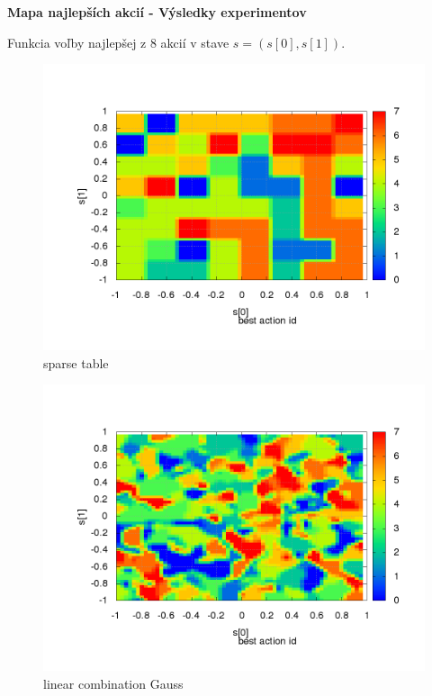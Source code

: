 \documentclass[xcolor=dvipsnames]{beamer}
\begin{document}
\begin{frame}{\bf Mapa najlepších akcií - Výsledky experimentov}

Funkcia voľby najlepšej z 8 akcií v stave  $s = (s[0], s[1])$.

\begin{minipage}{.5\textwidth}

\begin{figure}[!htb]
\centering
\includegraphics[scale=.21]{../../results_q_learning/map_1/function_type_1/iterations_10/action_best_value_log_surface.png}
\caption{sparse table}
\end{figure}

\end{minipage}%
\begin{minipage}{.5\textwidth}

\begin{figure}[!htb]
\centering
\includegraphics[scale=.21]{../../results_q_learning/map_1/function_type_2/iterations_10/action_best_value_log_surface.png}
\caption{linear combination Gauss}
\end{figure}


\end{minipage}
\end{frame}
\end{document}
